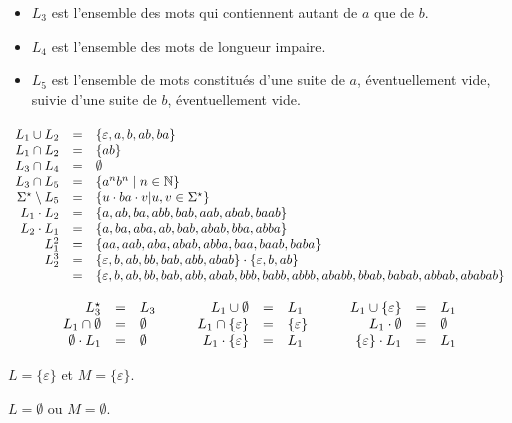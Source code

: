 \begin{corrections}

  \begin{questions}
  \item
    \begin{itemize}
    \item $L_3$ est l'ensemble des mots qui contiennent autant de $a$ que de $b$.
    \item $L_4$ est l'ensemble des mots de longueur impaire.
    \item $L_5$ est l'ensemble de mots constitués d'une suite de $a$, éventuellement
      vide, suivie d'une suite de $b$, éventuellement vide.
    \end{itemize}
  \item
    $\begin{array}[t]{rll}
    L_1 \cup L_2                &=& \{\varepsilon, a, b, ab, ba\}   \\ 
    L_1 \cap L_2                &=& \{ab\}   \\ 
    L_3 \cap L_4                &=& \emptyset   \\ 
    L_3 \cap L_5                &=& \{a^n b^n \mid n\in \mathbb{N}\}   \\ 
    \Sigma^\star \setminus L_5   &=& \{u \cdot ba \cdot v | u , v \in \Sigma^\star\}   \\ 
    L_1 \cdot L_2               &=& \{a, ab, ba, abb, bab, aab, abab, baab\}   \\ 
    L_2 \cdot L_1               &=& \{a, ba, aba, ab, bab, abab, bba, abba\}  \\ 
    L_1^2                       &=& \{aa, aab, aba, abab, abba, baa, baab, baba\}\\
    L_2^3                       &=& \{\varepsilon, b, ab, bb, bab, abb, abab\} \cdot \{\varepsilon, b, ab\}\\
    &=& \{\varepsilon, b, ab, bb, bab, abb, abab, bbb, babb, abbb, ababb, bbab, babab, abbab, ababab\}\\
  \end{array}$

    $$\begin{array}[t]{rll@{\quad\quad\quad}rll@{\quad\quad\quad}rll}
    L_3^\star                    &=& L_3             &
    L_1 \cup \emptyset          &=& L_1             & 
    L_1 \cup \{\varepsilon\}    &=& L_1             \\ 
    L_1 \cap \emptyset          &=& \emptyset       & 
    L_1 \cap \{\varepsilon\}    &=& \{\varepsilon\} & 
    L_1 \cdot \emptyset         &=& \emptyset       \\ 
    \emptyset \cdot L_1         &=& \emptyset       & 
    L_1 \cdot\{\varepsilon\}    &=& L_1             & 
    \{\varepsilon\}\cdot L_1    &=& L_1             \\ 
  \end{array}$$
  \item $L = \{\varepsilon\}$ et $M = \{\varepsilon\}$.
  \item $L = \emptyset$ ou $M = \emptyset$.
  \end{questions}

\end{corrections}

\endgroup
\endinput
